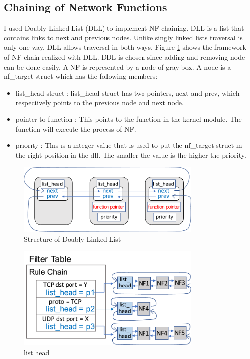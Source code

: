 \subsection{Chaining of Network Functions}
I used Doubly Linked List (DLL) to implement NF chaining. DLL is a list that contains links to next and previous nodes. Unlike singly linked lists traversal is only one way, DLL allows traversal in both ways. 
Figure \ref{fig: dll} shows the framework of NF chain realized with DLL. DDL is chosen since adding and removing node can be done easily. A NF is represented by a node of gray box. A node is a nf\_target struct which has the following members: 
\begin{itemize}
	\item list\_head struct : list\_head struct has two pointers, next and prev, which respectively points to the previous node and next node. 
	\item pointer to function : This points to the function in the kernel module. The function will execute the process of NF.
	\item priority : This is a integer value that is used to put the nf\_target struct in the right position in the dll. The smaller the value is the higher the priority.
\end{itemize}

\begin{figure}
	\centering
	\includegraphics[width=90mm]{pics/dll.pdf}
	\caption{Structure of Doubly Linked List}
	\label{fig: dll}
\end{figure}

\begin{figure}
	\centering
	\includegraphics[width=90mm]{pics/list_head.pdf}
	\caption{list head}
	\label{fig: listhead}
\end{figure}

